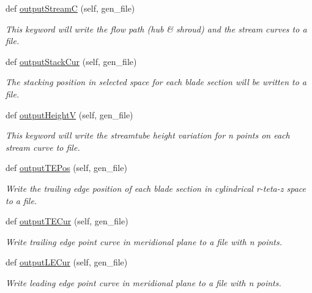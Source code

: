 \begin{DoxyCompactItemize}
def \hyperlink{classbladepro__modules_1_1inputfile__writer_1_1_input_writer_window_a6dc19a2bae75b4c52b4337a55574363d}{output\+StreamC} (self, gen\+\_\+file)
\begin{DoxyCompactList}\small\item\em This keyword will write the flow path (hub \& shroud) and the stream curves to a file. \end{DoxyCompactList}\item 
def \hyperlink{classbladepro__modules_1_1inputfile__writer_1_1_input_writer_window_a38ac1495c5c1cc730241601a8300d632}{output\+Stack\+Cur} (self, gen\+\_\+file)
\begin{DoxyCompactList}\small\item\em The stacking position in selected space for each blade section will be written to a file. \end{DoxyCompactList}\item 
def \hyperlink{classbladepro__modules_1_1inputfile__writer_1_1_input_writer_window_a15fdf4aaecf99b885796124500f80114}{output\+HeightV} (self, gen\+\_\+file)
\begin{DoxyCompactList}\small\item\em This keyword will write the streamtube height variation for n points on each stream curve to file. \end{DoxyCompactList}\item 
def \hyperlink{classbladepro__modules_1_1inputfile__writer_1_1_input_writer_window_af96b8ec5130403c737d4105e04edea5d}{output\+T\+E\+Pos} (self, gen\+\_\+file)
\begin{DoxyCompactList}\small\item\em Write the trailing edge position of each blade section in cylindrical r-\/teta-\/z space to a file. \end{DoxyCompactList}\item 
def \hyperlink{classbladepro__modules_1_1inputfile__writer_1_1_input_writer_window_a93fdb47e6f9162ce3fe7ef624f7681aa}{output\+T\+E\+Cur} (self, gen\+\_\+file)
\begin{DoxyCompactList}\small\item\em Write trailing edge point curve in meridional plane to a file with n points. \end{DoxyCompactList}\item 
def \hyperlink{classbladepro__modules_1_1inputfile__writer_1_1_input_writer_window_a55ddee4c839782858d6f53a49b9c63ec}{output\+L\+E\+Cur} (self, gen\+\_\+file)
\begin{DoxyCompactList}\small\item\em Write leading edge point curve in meridional plane to a file with n points. \end{DoxyCompactList}\item 

\end{DoxyCompactItemize}

